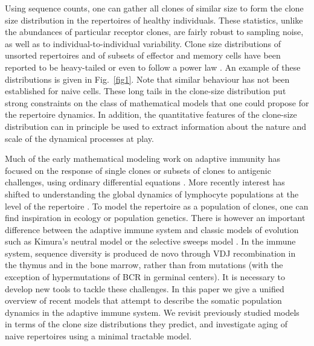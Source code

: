 \documentclass[aps,pre,twocolumn,superscriptaddress,groupedaddress]{revtex4}
\newcommand{\<}{\langle}
\renewcommand{\>}{\rangle}
\begin{document}
Using sequence counts, one can gather all clones of similar size to form the clone size distribution in the repertoires of healthy individuals. These statistics, unlike the abundances of particular receptor clones, are fairly robust to sampling noise, as well as to individual-to-individual variability.
Clone size distributions of unsorted repertoires and of subsets of effector and memory cells have been reported to be heavy-tailed or even to follow a power law \cite{Weinstein2009,Mora2010,Zarnitsyna2013,Bolkhovskaya2014a,Menzel2014,Muraro2014,Pogorelyy2016,Mora2016e,deBoerChain}. An example of these distributions is given in Fig.~\ref{fig1}. Note that similar behaviour has not been established for naive cells. These long tails in the clone-size distribution put strong constraints on the class of mathematical models that one could propose for the repertoire dynamics. In addition, the quantitative features of the clone-size distribution can in principle be used to extract information about the nature and scale of the dynamical processes at play.

{Much of the early mathematical modeling work on adaptive immunity has focused} on the response of single clones or subsets of clones to antigenic challenges, using ordinary differential equations \cite{Perelson2002}.
{More recently interest has shifted to understanding the global dynamics of lymphocyte populations at the level of the repertoire \cite{Johnson2012,Mayer2015,Lythe2016}.}
To model the repertoire as a population of clones, one can find inspiration in ecology or population genetics. There is however an important difference between the adaptive immune system and classic models of evolution such as Kimura's neutral model \cite{kimurabook} or the selective sweeps model \cite{Nielsen2005}. In the immune system, sequence diversity is produced de novo through VDJ recombination in the thymus and in the bone marrow, rather than from mutations (with the exception of hypermutations of BCR in germinal centers). It is necessary to develop new tools to tackle these challenges. {In this paper we give a unified overview of recent models that attempt to describe the somatic population dynamics in the adaptive immune system. We revisit previously studied models in terms of the clone size distributions they predict, and investigate aging of naive repertoires using a minimal tractable model.}

\maketitle
\end{document}
